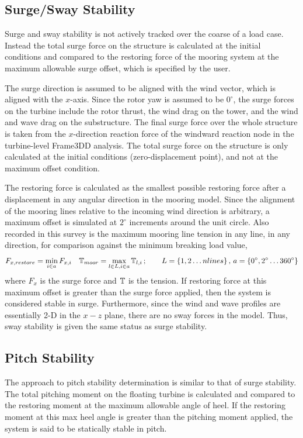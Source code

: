 \subsection{Surge/Sway Stability}
Surge and sway stability is not actively tracked over the coarse of a
load case.  Instead the total surge force on the structure is calculated
at the initial conditions and compared to the restoring force of the
mooring system at the maximum allowable surge offset, which is specified
by the user.

The surge direction is assumed to be aligned with the wind vector, which
is aligned with the $x$-axis.  Since the rotor yaw is assumed to be
$0^{\circ}$, the surge forces on the turbine include the rotor thrust,
the wind drag on the tower, and the wind and wave drag on the
substructure.  The final surge force over the whole structure is taken
from the $x$-direction reaction force of the windward reaction node in
the turbine-level Frame3DD analysis.  The total surge force on the
structure is only calculated at the initial conditions
(zero-displacement point), and not at the maximum offset condition.

The restoring force is calculated as the smallest possible restoring
force after a displacement in any angular direction in the mooring
model.  Since the alignment of the mooring lines relative to the
incoming wind direction is arbitrary, a maximum offset is simulated at
$2^{\circ}$ increments around the unit circle. Also recorded in this
survey is the maximum mooring line tension in any
line, in any direction, for comparison against the minimum breaking load
value,
\[
  F_{x,restore} = \min_{i\in a} F_{x,i}\quad \mathbb{T}_{moor} = \max_{l\in L,i\in a} \mathbb{T}_{l,i}\,;
\qquad L=\left\{1,2\ldots nlines\right\}, \, a= \left\{0^{\circ}, 2^{\circ}\ldots 360^{\circ}\right\}
\]
where $F_x$ is the surge force and $\mathbb{T}$ is the tension.  If
restoring force at this maximum offset is greater than the surge force
applied, then the system is considered stable in surge.  Furthermore,
since the wind and wave profiles are essentially 2-D in the $x-z$ plane,
there are no sway forces in the model.  Thus, sway stability is given
the same status as surge stability.


\subsection{Pitch Stability}
The approach to pitch stability determination is similar to that of
surge stability.  The total pitching moment on the floating turbine is
calculated and compared to the restoring moment at the maximum allowable
angle of heel.  If the restoring moment at this max heel angle is
greater than the pitching moment applied, the system is said to be
statically stable in pitch.

